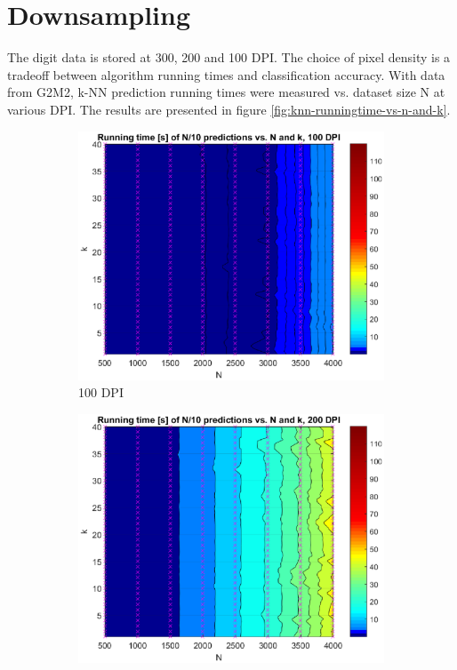 \section{Downsampling}
The digit data is stored at 300, 200 and 100 DPI.
The choice of pixel density is a tradeoff between
algorithm running times and classification accuracy.
With data from G2M2, k-NN prediction running times
were measured vs. dataset size N at various DPI.
The results
are presented in figure \ref{fig:knn-runningtime-vs-n-and-k}.
\begin{figure}[ht]
	\centering
	\begin{subfigure}[t]{0.3\textwidth}
		\includegraphics[width = \textwidth]{graphics/knn-runningtime-vs-n-and-k-2-2-dpi100}
		\caption{100 DPI}
	\end{subfigure}
	\begin{subfigure}[t]{0.3\textwidth}
		\includegraphics[width = \textwidth]{graphics/knn-runningtime-vs-n-and-k-2-2-dpi200}

\end{subfigure}
\end{figure}
